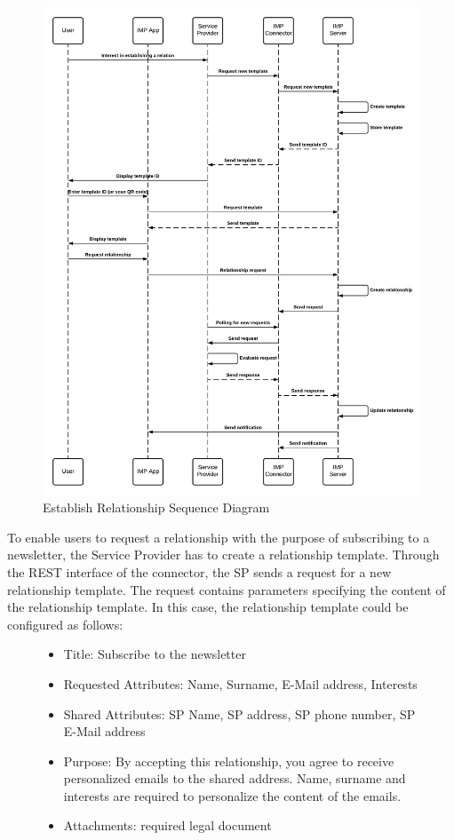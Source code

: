 \begin{figure}[h!]
    \centering
    \includegraphics[scale=0.6]{Diagrams/IMP Use Case Establish Relationship Sequence Diagram.pdf}
    \caption{Establish Relationship Sequence Diagram}
    \label{imp:establish_relationship}
\end{figure}

To enable users to request a relationship with the purpose of subscribing to a newsletter, the Service Provider has to create a relationship template. Through the REST interface of the connector, the SP sends a request for a new relationship template. The request contains parameters specifying the content of the relationship template. In this case, the relationship template could be configured as follows:
\begin{figure}[h!]
    \begin{itemize}
    \item Title: Subscribe to the newsletter
    \item Requested Attributes: Name, Surname, E-Mail address, Interests
    \item Shared Attributes: SP Name, SP address, SP phone number, SP E-Mail address
    \item Purpose: By accepting this relationship, you agree to receive personalized emails to the shared address. Name, surname and interests are required to personalize the content of the emails.
    \item Attachments: required legal document
\end{itemize}
\end{figure}


